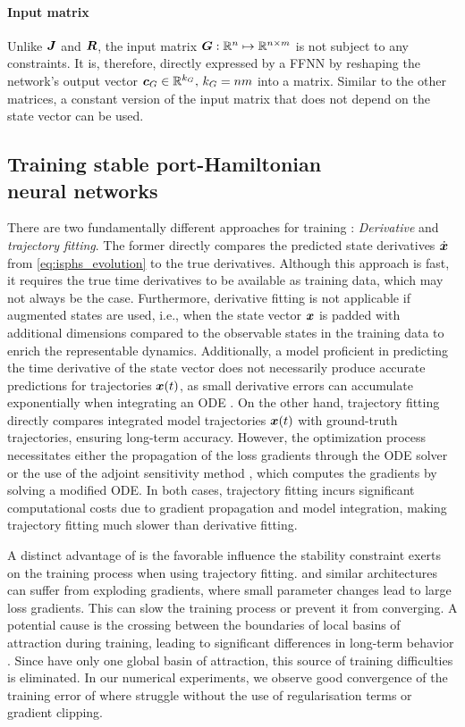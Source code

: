 \paragraph{Input matrix} 
Unlike $\boldsymbol{J}$ and $\boldsymbol{R}$, the input matrix ${\boldsymbol{G}: {\mathbb{R}}^n\mapsto \allowbreak {\mathbb{R}}^{n\times m}}$ is not subject to any constraints. It is, therefore, directly expressed by a \gls{FFNN} by reshaping the network's output vector $\boldsymbol{c}_G\in{\mathbb{R}}^{k_G},\,k_G=nm$ into a matrix. Similar to the other matrices, a constant version of the input matrix that does not depend on the state vector can be used.

\subsection[Training stable port-Hamiltonian neural networks]{Training stable port-Hamiltonian\\neural networks}
There are two fundamentally different approaches for training \sPHNNs: \emph{Derivative} and \emph{trajectory fitting}. 
The former directly compares the predicted state derivatives $\dot{\boldsymbol{x}}$ from \cref{eq:isphs_evolution} to the true derivatives. 
Although this approach is fast, it requires the true time derivatives to be available as training data, which may not always be the case. Furthermore, derivative fitting is not applicable if augmented states \cite{dupont2019} are used, i.e., when the state vector $\boldsymbol{x}$ is padded with additional dimensions compared to the observable states in the training data to enrich the representable dynamics. 
Additionally, a model proficient in predicting the time derivative of the state vector does not necessarily produce accurate predictions for trajectories $\boldsymbol{x}(t)$, as small derivative errors can accumulate exponentially when integrating an ODE \cite{hairer2009}.
On the other hand, trajectory fitting directly compares integrated model trajectories $\boldsymbol{x}(t)$ with ground-truth trajectories, ensuring long-term accuracy.
However, the optimization process necessitates either the propagation of the loss gradients through the ODE solver or the use of the adjoint sensitivity method \cite{chen2018}, which computes the gradients by solving a modified ODE. In both cases, trajectory fitting incurs significant computational costs due to gradient propagation and model integration, making trajectory fitting much slower than derivative fitting.

A distinct advantage of \sPHNNs is the favorable influence the stability constraint exerts on the training process when using trajectory fitting. 
\CapNODEs and similar architectures can suffer from exploding gradients, where small parameter changes lead to large loss gradients. 
This can slow the training process or prevent it from converging. 
A potential cause is the crossing between the boundaries of local basins of attraction during training, leading to significant differences in long-term behavior \cite{pascanu2013}. 
Since \sPHNNs have only one global basin of attraction, this source of training difficulties is eliminated. 
In our numerical experiments, we observe good convergence of the training error of \sPHNNs where \NODEs struggle without the use of regularisation terms or gradient clipping.
